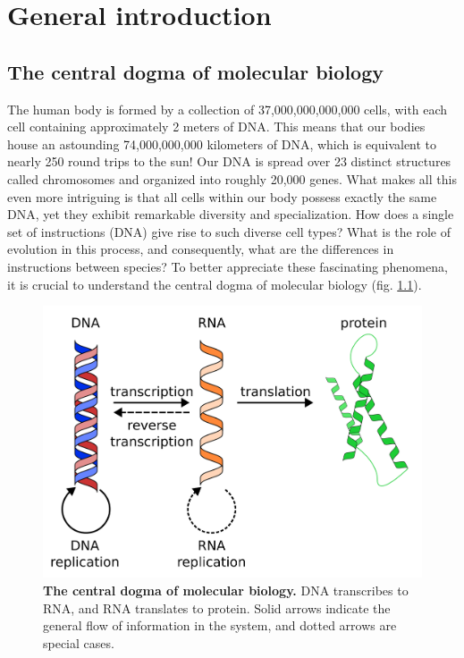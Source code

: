 \chapter{General introduction}\thumbforchapter
\newpage

\section{The central dogma of molecular biology}

The human body is formed by a collection of 37,000,000,000,000 cells\cite{Bianconi2013}, with each cell containing approximately 2 meters of DNA. This means that our bodies house an astounding 74,000,000,000 kilometers of DNA, which is equivalent to nearly 250 round trips to the sun! Our DNA is spread over 23 distinct structures called chromosomes and organized into roughly 20,000 genes. What makes all this even more intriguing is that all cells within our body possess exactly the same DNA, yet they exhibit remarkable diversity and specialization. How does a single set of instructions (DNA) give rise to such diverse cell types? What is the role of evolution in this process, and consequently, what are the differences in instructions between species? To better appreciate these fascinating phenomena, it is crucial to understand the central dogma of molecular biology (fig. \ref{fig:central_dogma}).

\begin{figure}[H]
    \center
    \includegraphics[width=0.7\linewidth]{ch.introduction/imgs/central_dogma.png}
    \caption{\textbf{The central dogma of molecular biology.} DNA transcribes to RNA, and RNA translates to protein. Solid arrows indicate the general flow of information in the system, and dotted arrows are special cases.}
    \label{fig:central_dogma}
\end{figure}


